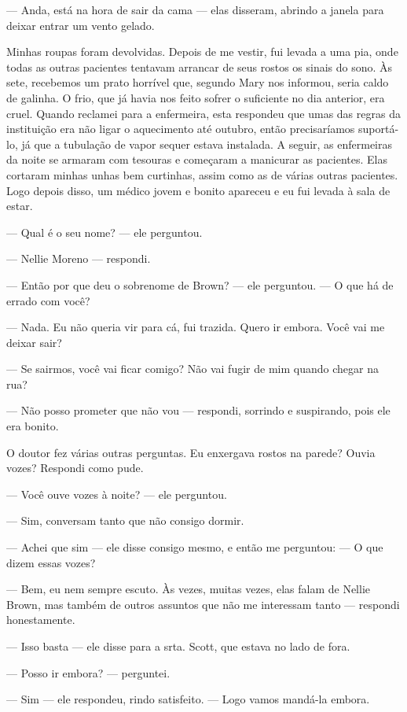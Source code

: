 --- Anda, está na hora de sair da cama --- elas
disseram, abrindo a janela para deixar entrar um vento gelado. 

Minhas
roupas foram devolvidas. Depois de me vestir, fui levada a uma pia, onde
todas as outras pacientes tentavam arrancar de seus rostos os sinais do
sono. Às sete, recebemos um prato horrível que, segundo Mary nos
informou, seria caldo de galinha. O frio, que já havia nos feito sofrer
o suficiente no dia anterior, era cruel. Quando reclamei para a
enfermeira, esta respondeu que umas das regras da instituição era não
ligar o aquecimento até outubro, então precisaríamos suportá-lo, já que
a tubulação de vapor sequer estava instalada. A seguir, as enfermeiras
da noite se armaram com tesouras e começaram a manicurar as pacientes.
Elas cortaram minhas unhas bem curtinhas, assim como as de várias outras
pacientes. Logo depois disso, um médico jovem e bonito apareceu e eu fui
levada à sala de estar.

--- Qual é o seu nome? --- ele perguntou.

--- Nellie Moreno --- respondi.

--- Então por que deu o sobrenome de Brown? --- ele perguntou. --- O que
há de errado com você?

--- Nada. Eu não queria vir para cá, fui trazida. Quero ir embora. Você
vai me deixar sair?

--- Se sairmos, você vai ficar comigo? Não vai fugir de mim quando
chegar na rua?

--- Não posso prometer que não vou --- respondi, sorrindo e suspirando,
pois ele era bonito.

O doutor fez várias outras perguntas. Eu enxergava rostos na parede?
Ouvia vozes? Respondi como pude.

--- Você ouve vozes à noite? --- ele perguntou.

--- Sim, conversam tanto que não consigo dormir.

--- Achei que sim --- ele disse consigo mesmo, e então me perguntou: ---
O que dizem essas vozes?

--- Bem, eu nem sempre escuto. Às vezes, muitas vezes, elas falam de
Nellie Brown, mas também de outros assuntos que não me interessam tanto
--- respondi honestamente.

--- Isso basta --- ele disse para a srta. Scott, que estava no lado de
fora.

--- Posso ir embora? --- perguntei.

--- Sim --- ele respondeu, rindo satisfeito. --- Logo vamos mandá-la
embora.


